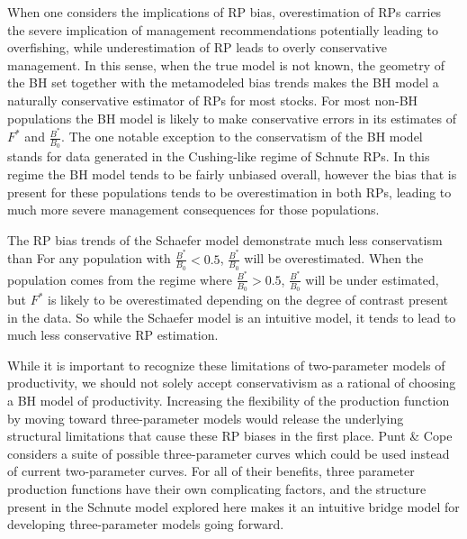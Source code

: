 {%
When one considers the implications of RP bias, overestimation of RPs carries
the severe implication of management recommendations potentially leading to
overfishing, while underestimation of RP leads to overly conservative management.
In this sense, when the true model is not known, the geometry of the BH set together
with the metamodeled bias trends makes the BH model a naturally conservative
estimator of RPs for most stocks. For most non-BH populations the BH model is
likely to make conservative errors in its estimates of $F^*$ and $\frac{B^*}{B_0}$.
The one notable exception to the conservatism of the BH model stands for data
generated in the Cushing-like regime of Schnute RPs. In this regime the BH
model tends to be fairly unbiased overall, however the bias that is present
for these populations tends to be overestimation in both RPs, leading to much
more severe management consequences for those populations.

%
The RP bias trends of the Schaefer model demonstrate much less {\color{red}conservatism} than
For any population with $\frac{B^*}{B_0}<0.5$, $\frac{B^*}{B_0}$ will be overestimated.
When the population comes from the regime where $\frac{B^*}{B_0}>0.5$, $\frac{B^*}{B_0}$
will be under estimated, but $F^*$ is likely to be overestimated depending on the degree of
contrast present in the data. So while the Schaefer model is an intuitive model, it tends to
lead to much less conservative RP estimation.

%
While it is important to recognize these limitations of two-parameter models
of productivity, we should not solely accept conservativism as a rational of
choosing a BH model of productivity. %
Increasing the flexibility of the production function by moving toward
three-parameter models would release the underlying structural limitations
\cite{mangel_perspective_2013} that cause these RP biases in the first place.
Punt \& Cope \cite{punt_extending_2019} %
considers a suite of possible three-parameter curves which could be used
instead of current two-parameter curves. For all of their benefits, three
parameter production functions have their own complicating factors, and the
structure present in the Schnute model explored here makes it an intuitive bridge
model for developing three-parameter models going forward.

}


